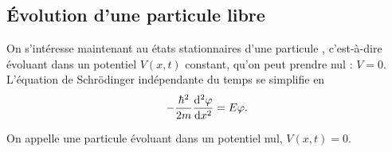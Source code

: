 \documentclass[12pt,fancy]{cours}
\begin{document}
\subsection{Évolution d'une particule libre}
On s'intéresse maintenant au états stationnaires d’une particule , c'est-à-dire évoluant dans un potentiel $V(x,t)$ constant, qu’on peut prendre nul : $V=0$. L’équation de Schrödinger indépendante du temps se simplifie en
\begin{equation*}
-\frac{\hbar^2}{2m}\frac{\mathrm{d}^2\varphi}{\mathrm{d} x^2}=E\varphi.
\end{equation*}
\begin{definition}\label{def:}
  On appelle  une particule évoluant dans un potentiel nul, $V(x,t)=0$.
\end{definition}
\end{document}
